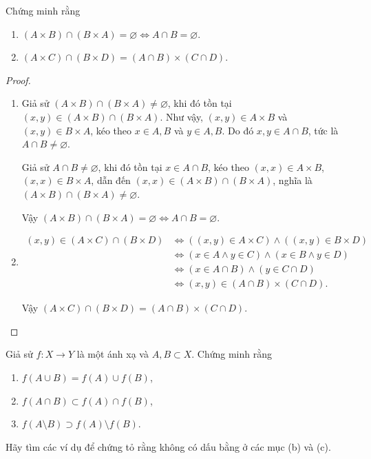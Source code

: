 \begin{exercise}Chứng minh rằng
    \begin{enumerate}[itemsep=0pt,label = (\alph*)]
        \item $(A\times B)\cap (B\times A) = \varnothing \Longleftrightarrow A\cap B = \varnothing$.
        \item $(A\times C)\cap (B\times D) = (A\cap B)\times (C\cap D)$.
    \end{enumerate}
\end{exercise}

\begin{proof}
    \begin{enumerate}[label = (\alph*)]
        \item Giả sử $(A\times B)\cap (B\times A) \ne \varnothing$, khi đó tồn tại $(x, y)\in (A\times B)\cap (B\times A)$. Như vậy, $(x, y)\in A\times B$ và $(x, y)\in B\times A$, kéo theo $x\in A, B$ và $y\in A, B$. Do đó $x, y\in A\cap B$, tức là $A\cap B\ne\varnothing$.

              Giả sử $A\cap B\ne\varnothing$, khi đó tồn tại $x\in A\cap B$, kéo theo $(x, x)\in A\times B$, $(x, x)\in B\times A$, dẫn đến $(x, x)\in (A\times B)\cap (B\times A)$, nghĩa là $(A\times B)\cap (B\times A) \ne \varnothing$.

              Vậy $(A\times B)\cap (B\times A) = \varnothing \Longleftrightarrow A\cap B = \varnothing$.
        \item \begin{align*}
                  (x, y) \in (A\times C)\cap (B\times D) & \Longleftrightarrow ((x,y)\in A\times C) \land ((x, y)\in B\times D) \\
                                                         & \Longleftrightarrow (x\in A \land y\in C) \land (x\in B \land y\in D) \\
                                                         & \Longleftrightarrow (x\in A\cap B) \land (y\in C\cap D) \\
                                                         & \Longleftrightarrow (x, y)\in (A\cap B)\times (C\cap D).
              \end{align*}

              Vậy $(A\times C)\cap (B\times D) = (A\cap B)\times (C\cap D)$.
    \end{enumerate}
\end{proof}

\begin{exercise}Giả sử $f: X\rightarrow Y$ là một ánh xạ và $A, B\subset X$. Chứng minh rằng
    \begin{enumerate}[itemsep=0pt,label={(\alph*)}]
        \item $f(A\cup B) = f(A)\cup f(B)$,
        \item $f(A\cap B) \subset f(A)\cap f(B)$,
        \item $f(A\setminus B) \supset f(A)\setminus f(B)$.
    \end{enumerate}
    \par Hãy tìm các ví dụ để chứng tỏ rằng không có dấu bằng ở các mục (b) và (c).
\end{exercise}


